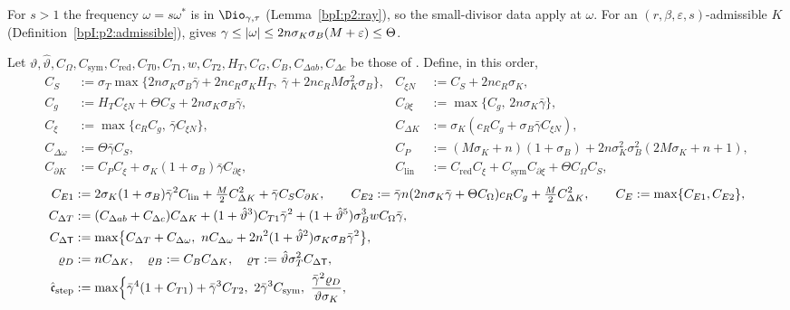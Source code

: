 For $s>1$ the frequency $\omega=s\omega^*$ is in $\Dio_{\gamma,\tau}$ (Lemma~\ref{bpI:p2:ray}), so the small-divisor data apply at $\omega$.
For an $(r,\beta,\varepsilon,s)$-admissible $K$ (Definition~\ref{bpI:p2:admissible}),  gives
$\gamma\le\lvert \omega\rvert\le2n\sigma_K\sigma_B(M+\varepsilon)\le\Theta$.

\begin{definition}[Constants]\label{bpI:p2s:constants}
Let $\vartheta,\hat\vartheta,C_\Omega,C_{\mathrm{sym}},C_{\mathrm{red}},C_{T0},C_{T1},w,C_{T2},H_T,C_G,C_B,C_{\Delta ab},C_{\Delta c}$ be those of
. Define, in this order,
\begin{align*}
C_S&:=\sigma_T\max\bigl\{2n\sigma_K\sigma_B\bar\gamma+2nc_R\sigma_KH_T,\ \bar\gamma+2nc_RM\sigma_K^2\sigma_B\bigr\}, &
C_{\xi N}&:=C_S+2nc_R\sigma_K,\\
C_g&:=H_TC_{\xi N}+\Theta C_S+2n\sigma_K\sigma_B\bar\gamma, & C_{\partial\xi}&:=\max\{C_g,\,2n\sigma_K\bar\gamma\},\\
C_\xi&:=\max\{c_RC_g,\,\bar\gamma C_{\xi N}\}, & C_{\Delta K}&:=\sigma_K(c_RC_g+\sigma_B\bar\gamma C_{\xi N}),\\
C_{\Delta\omega}&:=\Theta\bar\gamma C_S, & C_P&:=(M\sigma_K+n)(1+\sigma_B)+2n\sigma_K^2\sigma_B^2(2M\sigma_K+n+1),\\
C_{\partial K}&:=C_PC_\xi+\sigma_K(1+\sigma_B)\bar\gamma C_{\partial\xi}, &
C_{\mathrm{lin}}&:=C_{\mathrm{red}}C_\xi+C_{\mathrm{sym}}C_{\partial\xi}+\Theta C_\Omega C_S,
\end{align*}
\begin{align*}
C_{E1}&:=2\sigma_K(1+\sigma_B)\bar\gamma^2C_{\mathrm{lin}}+\tfrac M2C_{\Delta K}^2+\bar\gamma C_SC_{\partial K},\qquad
C_{E2}:=\bar\gamma n(2n\sigma_K\bar\gamma+\Theta C_\Omega)c_RC_g+\tfrac M2C_{\Delta K}^2,\qquad C_E:=\max\{C_{E1},C_{E2}\},\\
C_{\Delta T}&:=(C_{\Delta ab}+C_{\Delta c})C_{\Delta K}+(1+\hat\vartheta^3)C_{T1}\bar\gamma^2+(1+\hat\vartheta^5)\sigma_B^3wC_\Omega\bar\gamma,\\
C_{\Delta\mathsf T}&:=\max\bigl\{C_{\Delta T}+C_{\Delta\omega},\ nC_{\Delta\omega}+2n^2(1+\hat\vartheta^2)\sigma_K\sigma_B\bar\gamma^2\bigr\},\\
\varrho_D&:=nC_{\Delta K},\quad\varrho_B:=C_BC_{\Delta K},\quad\varrho_{\mathsf T}:=\hat\vartheta\sigma_T^2C_{\Delta\mathsf T},\\
\hat{\mathfrak c}_{\mathrm{step}}&:=\max\Bigl\{\bar\gamma^4(1+C_{T1})+\bar\gamma^3C_{T2},\ 2\bar\gamma^3C_{\mathrm{sym}},\ \frac{\bar\gamma^2\varrho_D}{\vartheta\sigma_K},\

\end{align*}
\end{definition}
